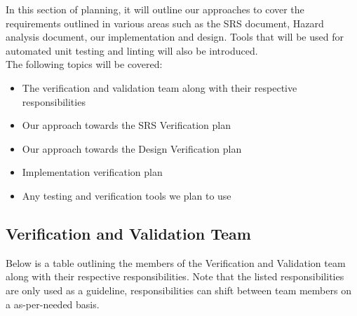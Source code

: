 \documentclass[12pt, titlepage]{article}
\begin{document}

  In this section of planning, it will outline our approaches to cover the requirements 
  outlined in various areas such as the SRS document, Hazard analysis document, our implementation and design. 
  Tools that will be used for automated unit testing and linting will also be introduced.\\

  The following topics will be covered:

  \begin{itemize}
    \item The verification and validation team along with their respective responsibilities
    \item Our approach towards the SRS Verification plan
    \item Our approach towards the Design Verification plan
    \item Implementation verification plan
    \item Any testing and verification tools we plan to use
  \end{itemize}


\subsection{Verification and Validation Team}


  Below is a table outlining the members of the Verification and Validation team along with their respective responsibilities.
  Note that the listed responsibilities are only used as a guideline, responsibilities can shift between team members on a as-per-needed basis.
\end{document}
